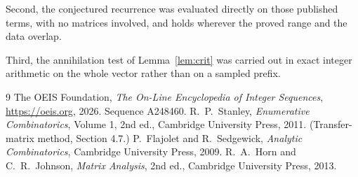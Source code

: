 \documentclass[11pt,a4paper]{article}
\theoremstyle{plain}
\theoremstyle{definition}
\begin{document}
Second, the conjectured recurrence was evaluated directly on those published terms, with no
matrices involved, and holds wherever the proved range and the data overlap.

Third, the annihilation test of Lemma~\ref{lem:crit} was carried out in exact integer
arithmetic on the whole vector rather than on a sampled prefix.

\begin{thebibliography}{9}
 The OEIS Foundation, \emph{The On-Line Encyclopedia of Integer
Sequences}, \url{https://oeis.org}, 2026. Sequence A248460.
 R.~P.~Stanley, \emph{Enumerative Combinatorics}, Volume 1, 2nd ed.,
Cambridge University Press, 2011. (Transfer-matrix method, Section 4.7.)
 P.~Flajolet and R.~Sedgewick, \emph{Analytic Combinatorics}, Cambridge
University Press, 2009.
 R.~A.~Horn and C.~R.~Johnson, \emph{Matrix Analysis}, 2nd ed., Cambridge
University Press, 2013.
\end{thebibliography}
\end{document}

